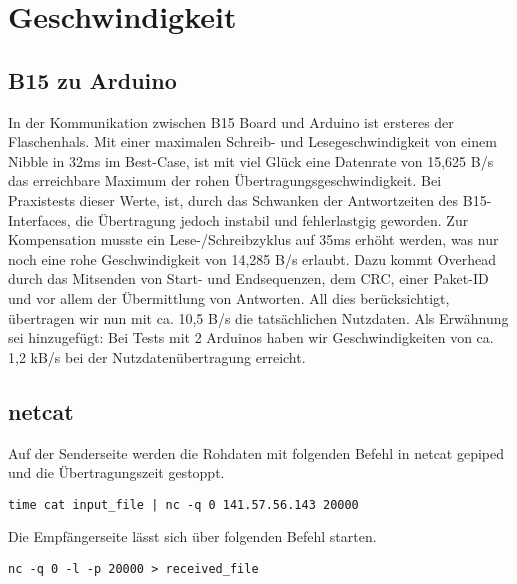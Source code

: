 

\chapter{Geschwindigkeit}
\section{B15 zu Arduino}
In der Kommunikation zwischen B15 Board und Arduino ist ersteres der Flaschenhals. Mit einer maximalen Schreib- und Lesegeschwindigkeit von einem Nibble in 32ms im Best-Case, ist mit viel Glück eine Datenrate von 15,625 B/s das erreichbare Maximum der rohen Übertragungsgeschwindigkeit. Bei Praxistests dieser Werte, ist, durch das Schwanken der Antwortzeiten des B15-Interfaces, die Übertragung jedoch instabil und fehlerlastgig geworden. Zur Kompensation musste ein Lese-/Schreibzyklus auf 35ms erhöht werden, was nur noch eine rohe Geschwindigkeit von 14,285 B/s erlaubt. Dazu kommt Overhead durch das Mitsenden von Start- und Endsequenzen, dem CRC, einer Paket-ID und vor allem der Übermittlung von Antworten. All dies berücksichtigt, übertragen wir nun mit ca. 10,5 B/s die tatsächlichen Nutzdaten. Als Erwähnung sei hinzugefügt: Bei Tests mit 2 Arduinos haben wir Geschwindigkeiten von ca. 1,2 kB/s bei der Nutzdatenübertragung erreicht.

\section{netcat}
Auf der Senderseite werden die Rohdaten mit folgenden Befehl in netcat gepiped und die Übertragungszeit gestoppt.
\begin{tcolorbox}[colback=gray!10,colframe=black,boxrule=0.5pt]
\begin{verbatim}
time cat input_file | nc -q 0 141.57.56.143 20000
\end{verbatim}
\end{tcolorbox}

\vspace{0.5cm}

\noindent
Die Empfängerseite lässt sich über folgenden Befehl starten.

\begin{tcolorbox}[colback=gray!10,colframe=black,boxrule=0.5pt]
\begin{verbatim}
nc -q 0 -l -p 20000 > received_file
\end{verbatim}
\end{tcolorbox}

